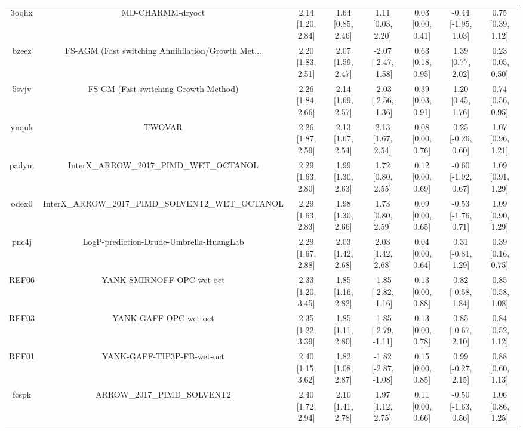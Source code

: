 \documentclass{article}
\begin{document}
\begin{center}
\begin{longtable}{|cccccccc|}
 3oqhx &                                   MD-CHARMM-dryoct &  2.14 [1.20, 2.84] &  1.64 [0.85, 2.46] &     1.11 [0.03, 2.20] &  0.03 [0.00, 0.41] &  -0.44 [-1.95, 1.03] &     0.75 [0.39, 1.12] \\
 bzeez &  FS-AGM (Fast switching Annihilation/Growth Met... &  2.20 [1.83, 2.51] &  2.07 [1.59, 2.47] &  -2.07 [-2.47, -1.58] &  0.63 [0.18, 0.95] &    1.39 [0.77, 2.02] &     0.23 [0.05, 0.50] \\
 5svjv &               FS-GM (Fast switching Growth Method) &  2.26 [1.84, 2.66] &  2.14 [1.69, 2.57] &  -2.03 [-2.56, -1.36] &  0.39 [0.03, 0.91] &    1.20 [0.45, 1.76] &     0.74 [0.56, 0.95] \\
 ynquk &                                             TWOVAR &  2.26 [1.87, 2.59] &  2.13 [1.67, 2.54] &     2.13 [1.67, 2.54] &  0.08 [0.00, 0.76] &   0.25 [-0.26, 0.60] &     1.07 [0.96, 1.21] \\
 padym &            InterX\_ARROW\_2017\_PIMD\_WET\_OCTANOL &  2.29 [1.63, 2.80] &  1.99 [1.30, 2.63] &     1.72 [0.80, 2.55] &  0.12 [0.00, 0.69] &  -0.60 [-1.92, 0.67] &     1.09 [0.91, 1.29] \\
 odex0 &  InterX\_ARROW\_2017\_PIMD\_SOLVENT2\_WET\_OCTANOL &  2.29 [1.63, 2.83] &  1.98 [1.30, 2.66] &     1.73 [0.80, 2.59] &  0.09 [0.00, 0.65] &  -0.53 [-1.76, 0.71] &     1.09 [0.90, 1.29] \\
 pnc4j &            LogP-prediction-Drude-Umbrella-HuangLab &  2.29 [1.67, 2.88] &  2.03 [1.42, 2.68] &     2.03 [1.42, 2.68] &  0.04 [0.00, 0.64] &   0.31 [-0.81, 1.29] &     0.39 [0.16, 0.75] \\
 REF06 &                          YANK-SMIRNOFF-OPC-wet-oct &  2.33 [1.20, 3.45] &  1.85 [1.16, 2.82] &  -1.85 [-2.82, -1.16] &  0.13 [0.00, 0.88] &   0.82 [-0.58, 1.84] &     0.85 [0.58, 1.08] \\
 REF03 &                              YANK-GAFF-OPC-wet-oct &  2.35 [1.22, 3.39] &  1.85 [1.11, 2.80] &  -1.85 [-2.79, -1.11] &  0.13 [0.00, 0.78] &   0.85 [-0.67, 2.10] &     0.84 [0.52, 1.12] \\
 REF01 &                         YANK-GAFF-TIP3P-FB-wet-oct &  2.40 [1.15, 3.62] &  1.82 [1.08, 2.87] &  -1.82 [-2.87, -1.08] &  0.15 [0.00, 0.85] &   0.99 [-0.27, 2.15] &     0.88 [0.60, 1.13] \\
 fcspk &                        ARROW\_2017\_PIMD\_SOLVENT2 &  2.40 [1.72, 2.94] &  2.10 [1.41, 2.78] &     1.97 [1.12, 2.75] &  0.11 [0.00, 0.66] &  -0.50 [-1.63, 0.56] &     1.06 [0.86, 1.25] \\

\end{longtable}
\end{center}
\end{document}
